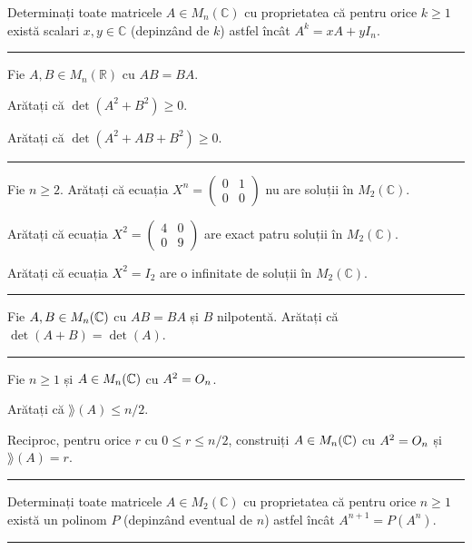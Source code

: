 Determinați toate matricele $A\in M_n(\mathbb{C})$ cu proprietatea că pentru orice $k\ge1$ există scalari $x,y\in\mathbb{C}$ (depinzând de $k$) astfel încât $A^k=xA+yI_n$.
\vspace{1mm}\hrule

Fie $A,B\in M_n(\mathbb{R})$ cu $AB=BA$.
\begin{parti}
  \item Arătați că $\det(A^2+B^2)\ge0$.
  \item Arătați că $\det(A^2+AB+B^2)\ge0$.
\end{parti}
\vspace{1mm}\hrule

\begin{parti}
  \item Fie $n\ge2$. Arătați că ecuația $X^n=\begin{pmatrix}0&1\\0&0\end{pmatrix}$ nu are soluții în $M_2(\mathbb{C})$.
  \item Arătați că ecuația $X^2=\begin{pmatrix}4&0\\0&9\end{pmatrix}$ are exact patru soluții în $M_2(\mathbb{C})$.
  \item Arătați că ecuația $X^2=I_2$ are o infinitate de soluții în $M_2(\mathbb{C})$.
\end{parti}
\vspace{1mm}\hrule

Fie $A,B\in M_n(\mathbb{C})$ cu $AB=BA$ și $B$ nilpotentă. Arătați că $\det(A+B)=\det(A)$.
\vspace{1mm}\hrule

Fie $n\ge1$ și $A\in M_n(\mathbb{C})$ cu $A^2=O_n$.
\begin{parti}
  \item Arătați că $\rang(A)\le n/2$.
  \item Reciproc, pentru orice $r$ cu $0\le r\le n/2$, construiți $A\in M_n(\mathbb{C})$ cu $A^2=O_n$ și $\rang(A)=r$.
\end{parti}
\vspace{1mm}\hrule

Determinați toate matricele $A\in M_2(\mathbb{C})$ cu proprietatea că pentru orice $n\ge1$ există un polinom $P$ (depinzând eventual de $n$) astfel încât $A^{n+1}=P(A^n)$.
\vspace{1mm}\hrule


